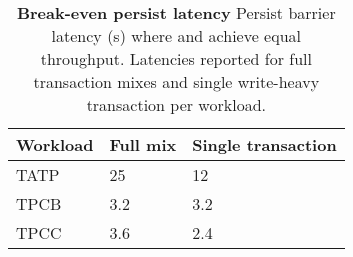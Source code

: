 \begin{table}
  \centering
  \begin{tabular}{l l l}
    \hline
    Workload & Full mix & Single transaction \\
    \hline \hline
    TATP & 25 & 12 \\
    TPCB & 3.2 & 3.2 \\
    TPCC & 3.6 & 2.4 \\
    \hline
  \end{tabular}
  \caption{\textbf{Break-even persist latency} Persist barrier latency (\textmu s) where \NVDisk and \InPlace achieve equal throughput.  Latencies reported for full transaction mixes and single write-heavy transaction per workload.}
  \label{table::PersistLatencyBreakeven}
\end{table}
